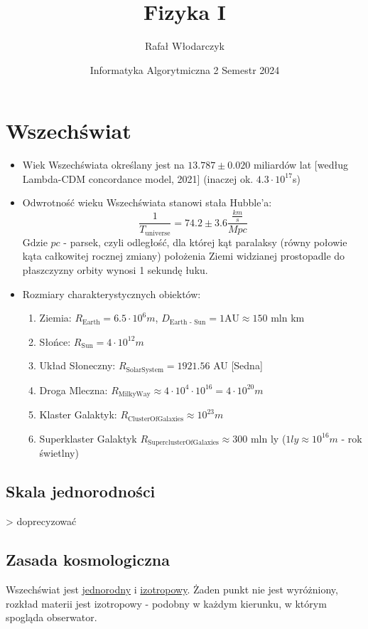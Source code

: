 \documentclass{article}
\author{Rafał Włodarczyk}
\title{Fizyka I}
\date{Informatyka Algorytmiczna 2 Semestr 2024}
\theoremstyle{definition}
\theoremstyle{definition}
\theoremstyle{definition}
\theoremstyle{definition}
\begin{document}
\maketitle

\section{Wszechświat}

\begin{itemize}
\item Wiek Wszechświata określany jest na $13.787\pm0.020$ miliardów lat [według Lambda-CDM concordance model, 2021] (inaczej ok. $4.3 \cdot 10^{17}$s)
\item Odwrotność wieku Wszechświata stanowi stała Hubble'a: 
\[\frac{1}{T_{\text{universe}}} = 74.2\pm 3.6 \frac{\frac{km}{s}}{Mpc}\]
Gdzie $pc$ - parsek, czyli odległość, dla której kąt paralaksy (równy połowie kąta całkowitej rocznej zmiany) położenia Ziemi widzianej prostopadle do płaszczyzny orbity wynosi 1 sekundę łuku.
\item Rozmiary charakterystycznych obiektów:
    \begin{enumerate}
    \item Ziemia: $R_{\text{Earth}} = 6.5 \cdot 10^{6} m$, $D_{\text{Earth - Sun}} = 1\text{AU} \approx 150$ mln km
    \item Słońce: $R_{\text{Sun}} = 4\cdot 10^{12} m$
    \item Układ Słoneczny: $R_{\text{SolarSystem}} = 1921.56$ AU [Sedna]
    \item Droga Mleczna: $R_{\text{MilkyWay}} \approx 4 \cdot 10^4 \cdot 10^{16} = 4\cdot 10^{20} m$
    \item Klaster Galaktyk: $R_{\text{ClusterOfGalaxies}} \approx 10^{23} m$
    \item Superklaster Galaktyk $R_{\text{SuperclusterOfGalaxies}} \approx 300$ mln ly ($1ly \approx 10^{16} m$ - rok świetlny)
    \end{enumerate}
\end{itemize}
\subsection{Skala jednorodności}
> doprecyzować
\subsection{Zasada kosmologiczna}
Wszechświat jest \underline{jednorodny} i \underline{izotropowy}. Żaden punkt nie jest wyróżniony, rozkład materii jest izotropowy - podobny w każdym kierunku, w którym spogląda obserwator.
\end{document}
